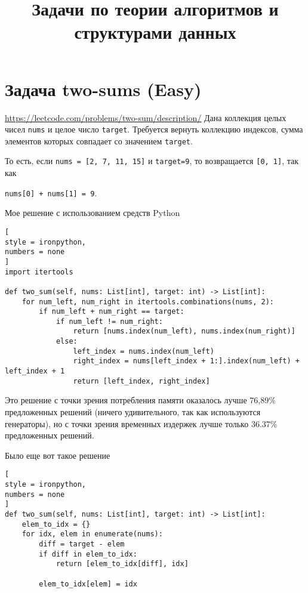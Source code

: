 \documentclass[%
	11pt,
	a4paper,
	utf8,
		]{article}
\begin{document}
\title{Задачи по теории алгоритмов и структурами данных}

\author{}

\date{}
\maketitle

\thispagestyle{fancy}

\tableofcontents

\section{Задача two-sums (Easy)}

\url{https://leetcode.com/problems/two-sum/description/} Дана коллекция целых чисел \verb|nums| и целое число \verb|target|. Требуется вернуть коллекцию индексов, сумма элементов которых совпадает со значением \verb|target|.

То есть, если \verb|nums = [2, 7, 11, 15]| и \verb|target=9|, то возвращается \verb|[0, 1]|, так как 

\verb|nums[0] + nums[1] = 9|.

Мое решение с использованием средств Python
\begin{lstlisting}[
style = ironpython,
numbers = none
]
import itertools

def two_sum(self, nums: List[int], target: int) -> List[int]:
	for num_left, num_right in itertools.combinations(nums, 2):
		if num_left + num_right == target:
			if num_left != num_right:
				return [nums.index(num_left), nums.index(num_right)]
			else:
				left_index = nums.index(num_left)
				right_index = nums[left_index + 1:].index(num_left) + left_index + 1
				return [left_index, right_index]
\end{lstlisting}

Это решение с точки зрения потребления памяти оказалось лучше 76,89\% предложенных решений (ничего удивительного, так как используются генераторы), но с точки зрения временных издержек лучше только 36.37\% предложенных решений.

Было еще вот такое решение
\begin{lstlisting}[
style = ironpython,
numbers = none
]
def two_sum(self, nums: List[int], target: int) -> List[int]:
	elem_to_idx = {}
	for idx, elem in enumerate(nums):
		diff = target - elem
		if diff in elem_to_idx:
			return [elem_to_idx[diff], idx]
			
		elem_to_idx[elem] = idx
\end{lstlisting}
\end{document}
